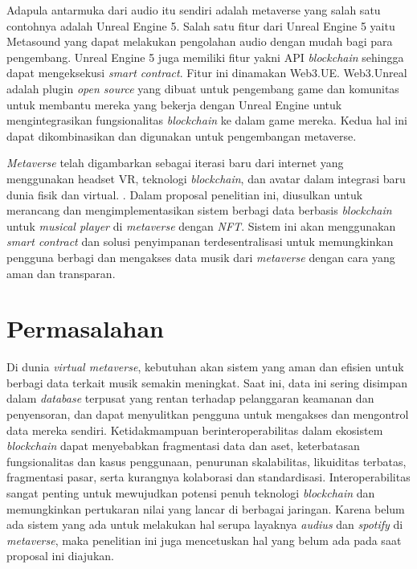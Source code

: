 Adapula antarmuka dari audio itu sendiri adalah metaverse yang salah satu contohnya adalah Unreal Engine 5. Salah satu fitur dari Unreal Engine 5
yaitu Metasound yang dapat melakukan pengolahan audio dengan mudah bagi para pengembang. Unreal Engine 5 juga
memiliki fitur yakni API \emph{blockchain} sehingga dapat mengeksekusi \emph{smart contract}. Fitur ini dinamakan Web3.UE. Web3.Unreal adalah plugin
\emph{open source} yang dibuat untuk pengembang game dan komunitas untuk membantu mereka yang bekerja dengan Unreal Engine untuk mengintegrasikan
fungsionalitas \emph{blockchain} ke dalam game mereka. Kedua hal ini dapat dikombinasikan dan digunakan untuk
pengembangan metaverse.

\emph{Metaverse} telah digambarkan sebagai iterasi baru dari internet yang menggunakan headset VR, teknologi \emph{blockchain},
dan avatar dalam integrasi baru dunia fisik dan virtual. \parencite{DWIVEDI2022102542}. Dalam proposal penelitian ini, diusulkan
untuk merancang dan mengimplementasikan sistem berbagi data berbasis \emph{blockchain}
untuk \emph{musical player} di \emph{metaverse} dengan \emph{NFT}. Sistem ini akan menggunakan \emph{smart contract} dan solusi penyimpanan terdesentralisasi
untuk memungkinkan pengguna berbagi dan mengakses data musik dari \emph{metaverse} dengan cara yang aman dan transparan.

\section{Permasalahan}
\label{sec:permasalahan}

Di dunia \emph{virtual metaverse}, kebutuhan akan sistem yang aman dan efisien untuk berbagi data terkait musik semakin meningkat.
Saat ini, data ini sering disimpan dalam \emph{database} terpusat yang rentan terhadap pelanggaran keamanan dan
penyensoran, dan dapat menyulitkan pengguna untuk mengakses dan mengontrol data mereka sendiri. Ketidakmampuan berinteroperabilitas 
dalam ekosistem \emph{blockchain} dapat menyebabkan fragmentasi data dan aset, keterbatasan fungsionalitas dan kasus penggunaan, penurunan skalabilitas, 
likuiditas terbatas, fragmentasi pasar, serta kurangnya kolaborasi dan standardisasi. Interoperabilitas sangat penting untuk mewujudkan potensi penuh teknologi 
\emph{blockchain} dan memungkinkan pertukaran nilai yang lancar di berbagai jaringan. Karena belum ada sistem yang ada untuk melakukan
hal serupa layaknya \emph{audius} dan \emph{spotify} di \emph{metaverse},
maka penelitian ini juga mencetuskan hal yang belum ada pada saat proposal ini diajukan.

